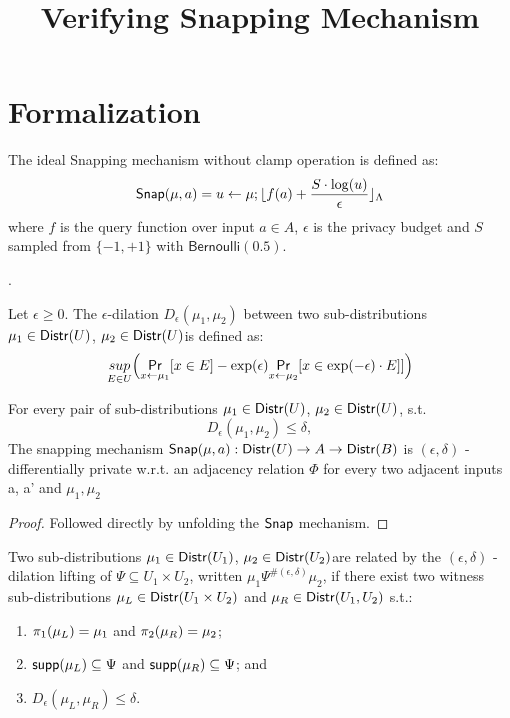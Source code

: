 \documentclass{article}
\begin{document}
\title{Verifying Snapping Mechanism}

\maketitle

\section{Formalization}
\begin{defn}
The ideal Snapping mechanism without clamp operation is defined as:
\[
	\mathsf{Snap}(\mu, a) = u \leftarrow \mu; \lfloor f(a) + \frac{ S \cdot \log(u)}{\epsilon} \rfloor_{\Lambda} 
\]
where $f$ is the query function over input $a \in A$, $\epsilon$ is the privacy budget and $S $ sampled from $ \{-1, +1\}$ with $\mathsf{Bernoulli}(0.5)$.
\end{defn}

\begin{defn}
.

Let $\epsilon \geq 0$. The $\epsilon$-dilation $D_{\epsilon}(\mu_1, \mu_2)$ between two sub-distributions $\mu_1 \in \mathsf{Distr}(U)$, $\mu_2 \in \mathsf{Distr}(U)$is defined as:
\[	
	\underset{E \in U}{sup}\Big(\underset{x \leftarrow \mu_1}{\mathsf{Pr}}[x \in E] - \exp(\epsilon) \underset{x \leftarrow \mu_2}{\mathsf{Pr}}[x \in \exp(-\epsilon) \cdot E]]\Big)
\]
\end{defn}

\begin{prop}
For every pair of sub-distributions $\mu_1 \in \mathsf{Distr}(U)$, $\mu_2 \in \mathsf{Distr}(U)$, s.t. 
\[
D_{\epsilon}(\mu_1, \mu_2) \leq \delta,
\]
The snapping mechanism $\mathsf{Snap}(\mu, a) : \mathsf{Distr}(U) \to A \to \mathsf{Distr}(B)$ is $(\epsilon, \delta)$ - differentially private w.r.t. an adjacency relation $\Phi$ for every two adjacent inputs a, a’ and $\mu_1, \mu_2$
\end{prop}

\begin{proof}
Followed directly by unfolding the $\mathsf{Snap}$ mechanism.
\end{proof}

\begin{defn}
Two sub-distributions $\mu_1 \in \mathsf{Distr}(U_1)$, $\mu_2 \in \mathsf{Distr}(U_2)$are related by the $(\epsilon, \delta)$ - dilation lifting of $\Psi \subseteq U_1 \times U_2$, written $\mu_1 \Psi^{\#(\epsilon, \delta)} \mu_2$, if there exist two witness sub-distributions $\mu_L \in \mathsf{Distr}(U_1 \times U_2)$ and $\mu_R \in \mathsf{Distr}(U_1, U_2)$ s.t.:
\begin{enumerate}
	\item $\pi_1(\mu_L) = \mu_1$ and $\pi_2(\mu_R) = \mu_2$;
	\item $\mathsf{supp}(\mu_L) \subseteq \Psi$ and $\mathsf{supp}(\mu_R) \subseteq \Psi$; and
	\item $D_{\epsilon}(\mu_L, \mu_R) \leq \delta$.
\end{enumerate}
\end{defn}
\end{document}

